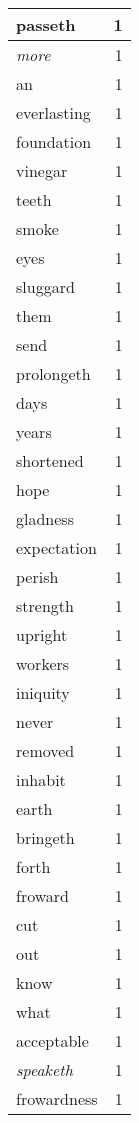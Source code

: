 \begin{center}
\begin{longtable}{l|r}
passeth & 1\\ \hline 
\emph{more} & 1\\ \hline 
an & 1\\ \hline 
everlasting & 1\\ \hline 
foundation & 1\\ \hline 
vinegar & 1\\ \hline 
teeth & 1\\ \hline 
smoke & 1\\ \hline 
eyes & 1\\ \hline 
sluggard & 1\\ \hline 
them & 1\\ \hline 
send & 1\\ \hline 
prolongeth & 1\\ \hline 
days & 1\\ \hline 
years & 1\\ \hline 
shortened & 1\\ \hline 
hope & 1\\ \hline 
gladness & 1\\ \hline 
expectation & 1\\ \hline 
perish & 1\\ \hline 
strength & 1\\ \hline 
upright & 1\\ \hline 
workers & 1\\ \hline 
iniquity & 1\\ \hline 
never & 1\\ \hline 
removed & 1\\ \hline 
inhabit & 1\\ \hline 
earth & 1\\ \hline 
bringeth & 1\\ \hline 
forth & 1\\ \hline 
froward & 1\\ \hline 
cut & 1\\ \hline 
out & 1\\ \hline 
know & 1\\ \hline 
what & 1\\ \hline 
acceptable & 1\\ \hline 
\emph{speaketh} & 1\\ \hline 
frowardness & 1\\ \hline 
\end{longtable}  
\end{center}  


  
\normalsize  

